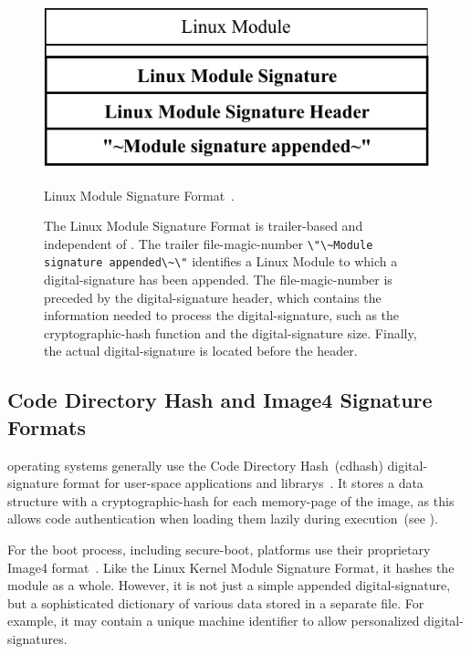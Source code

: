 \begin{figure}[htb]
  \centering
  \includegraphics{figures/LinuxSig.pdf}
  \caption{Linux Module Signature Format~\cite{linux-kmod-sig}.}
  \label{fig:linux_sig}
  \caption*{The Linux Module Signature Format is trailer-based and independent of . The trailer \gls{file-magic-number} \lstinline{\"\~Module signature appended\~\"} identifies a Linux Module to which a \gls{digital-signature} has been appended. The \gls{file-magic-number} is preceded by the \gls{digital-signature} header, which contains the information needed to process the \gls{digital-signature}, such as the \gls{cryptographic-hash} function and the \gls{digital-signature} size. Finally, the actual \gls{digital-signature} is located before the header.}
\end{figure}

\subsection{Code Directory Hash and Image4 Signature Formats}
\label{sec:cdhash}

 operating systems generally use the Code Directory Hash~(cdhash) \gls{digital-signature} format for \gls{user-space} applications and \glspl{library}~\cite{apple-cdhash,apple-cdhash-old}. It stores a data structure with a \gls{cryptographic-hash} for each \gls{memory-page} of the  \gls{image}, as this allows code authentication when loading them lazily during execution~(see ).

For the boot process, including \gls{secure-boot},  platforms use their proprietary Image4 format~\cite{xnu,opencore}. Like the Linux Kernel Module Signature Format, it hashes the module as a whole. However, it is not just a simple appended \gls{digital-signature}, but a sophisticated dictionary of various data stored in a separate file. For example, it may contain a unique machine identifier to allow personalized \glspl{digital-signature}.

